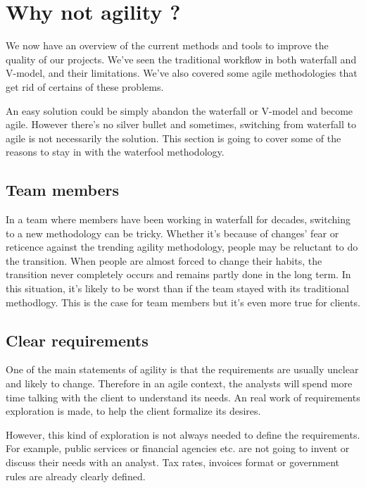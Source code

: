 \section{Why not agility ?}\label{sec:why-not-agility}

We now have an overview of the current methods and tools to improve the quality of our projects. 
We've seen the traditional workflow in both waterfall and V-model, and their limitations.
We've also covered some agile methodologies that get rid of certains of these problems.

An easy solution could be simply abandon the waterfall or V-model and become agile.
However there's no silver bullet and sometimes, switching from waterfall to agile is not necessarily the solution. 
This section is going to cover some of the reasons to stay in with the waterfool methodology.

\subsection{Team members}\label{subsec:team-members}
In a team where members have been working in waterfall for decades, switching to a new methodology can be tricky.
Whether it's because of changes' fear or reticence against the trending agility methodology, people may be reluctant to do the transition.
When people are almost forced to change their habits, the transition never completely occurs and remains partly done in the long term.
In this situation, it's likely to be worst than if the team stayed with its traditional methodlogy.
This is the case for team members but it's even more true for clients.

\subsection{Clear requirements}\label{subsec:clear-requirements}
One of the main statements of agility is that the requirements are usually unclear and likely to change.
Therefore in an agile context, the analysts will spend more time talking with the client to understand its needs.
An real work of requirements exploration is made, to help the client formalize its desires.

However, this kind of exploration is not always needed to define the requirements.
For example, public services or financial agencies etc.
are not going to invent or discuss their needs with an analyst.
Tax rates, invoices format or government rules are already clearly defined.


